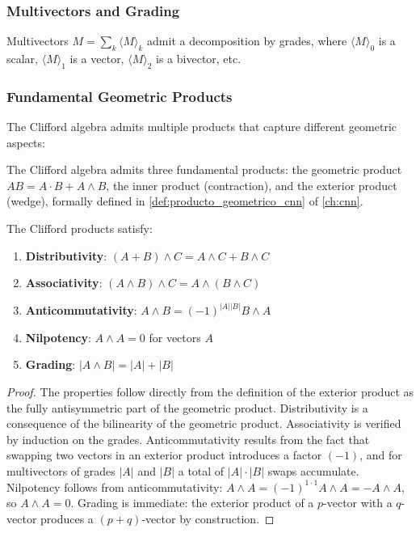 \subsubsection{Multivectors and Grading}

Multivectors $M = \sum_k \langle M \rangle_k$ admit a decomposition by grades, where $\langle M \rangle_0$ is a scalar, $\langle M \rangle_1$ is a vector, $\langle M \rangle_2$ is a bivector, etc.\label{def:multivector}

\subsubsection{Fundamental Geometric Products}

The Clifford algebra admits multiple products that capture different geometric aspects:

The Clifford algebra admits three fundamental products: the geometric product $AB = A \cdot B + A \wedge B$, the inner product (contraction), and the exterior product (wedge), formally defined in \autoref{def:producto_geometrico_cnn} of \autoref{ch:cnn}.\label{def:productos_clifford}

\begin{proposition}\label{prop:propiedades_productos_clifford}
The Clifford products satisfy:
\begin{enumerate}
    \item \textbf{Distributivity}: $(A + B) \wedge C = A \wedge C + B \wedge C$
    \item \textbf{Associativity}: $(A \wedge B) \wedge C = A \wedge (B \wedge C)$
    \item \textbf{Anticommutativity}: $A \wedge B = (-1)^{|A||B|} B \wedge A$
    \item \textbf{Nilpotency}: $A \wedge A = 0$ for vectors $A$
    \item \textbf{Grading}: $|A \wedge B| = |A| + |B|$
\end{enumerate}
\end{proposition}

\begin{proof}
The properties follow directly from the definition of the exterior product as the fully antisymmetric part of the geometric product. Distributivity is a consequence of the bilinearity of the geometric product. Associativity is verified by induction on the grades. Anticommutativity results from the fact that swapping two vectors in an exterior product introduces a factor $(-1)$, and for multivectors of grades $|A|$ and $|B|$ a total of $|A| \cdot |B|$ swaps accumulate. Nilpotency follows from anticommutativity: $A \wedge A = (-1)^{1 \cdot 1} A \wedge A = -A \wedge A$, so $A \wedge A = 0$. Grading is immediate: the exterior product of a $p$-vector with a $q$-vector produces a $(p+q)$-vector by construction.
\end{proof}

